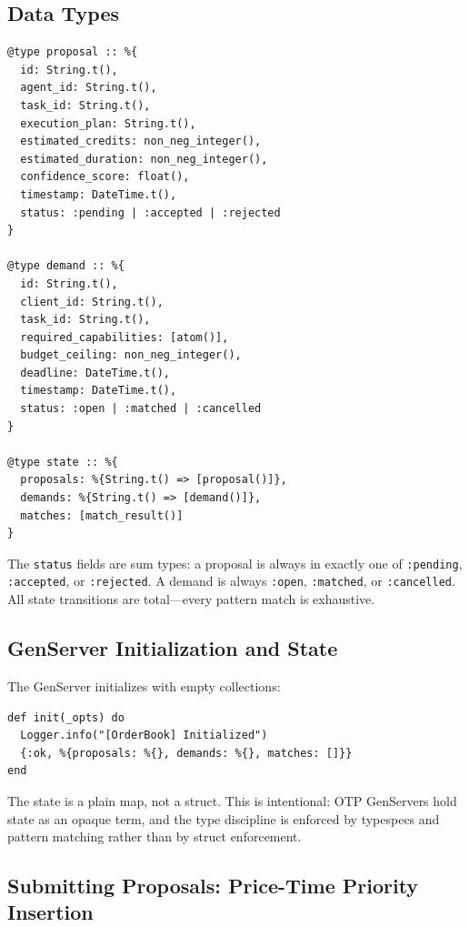 \documentclass[12pt,a4paper]{article}
\theoremstyle{plain}
\theoremstyle{definition}
\begin{document}
\subsection{Data Types}

\begin{lstlisting}[caption={Order book types},label={lst:ob-types}]
@type proposal :: %{
  id: String.t(),
  agent_id: String.t(),
  task_id: String.t(),
  execution_plan: String.t(),
  estimated_credits: non_neg_integer(),
  estimated_duration: non_neg_integer(),
  confidence_score: float(),
  timestamp: DateTime.t(),
  status: :pending | :accepted | :rejected
}

@type demand :: %{
  id: String.t(),
  client_id: String.t(),
  task_id: String.t(),
  required_capabilities: [atom()],
  budget_ceiling: non_neg_integer(),
  deadline: DateTime.t(),
  timestamp: DateTime.t(),
  status: :open | :matched | :cancelled
}

@type state :: %{
  proposals: %{String.t() => [proposal()]},
  demands: %{String.t() => [demand()]},
  matches: [match_result()]
}
\end{lstlisting}

The \texttt{status} fields are sum types: a proposal is always in exactly one of \texttt{:pending}, \texttt{:accepted}, or \texttt{:rejected}. A demand is always \texttt{:open}, \texttt{:matched}, or \texttt{:cancelled}. All state transitions are total---every pattern match is exhaustive.

\subsection{GenServer Initialization and State}

The GenServer initializes with empty collections:

\begin{lstlisting}[caption={OrderBook initialization},label={lst:ob-init}]
def init(_opts) do
  Logger.info("[OrderBook] Initialized")
  {:ok, %{proposals: %{}, demands: %{}, matches: []}}
end
\end{lstlisting}

The state is a plain map, not a struct. This is intentional: OTP GenServers hold state as an opaque term, and the type discipline is enforced by typespecs and pattern matching rather than by struct enforcement.

\subsection{Submitting Proposals: Price-Time Priority Insertion}
\end{document}
